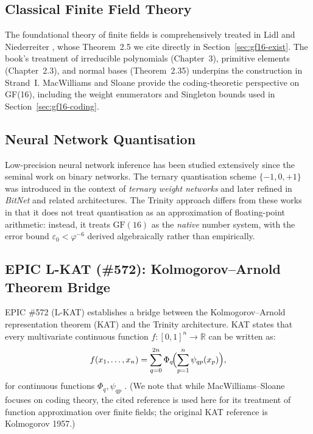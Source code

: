 \subsection{Classical Finite Field Theory}

The foundational theory of finite fields is comprehensively treated in
Lidl and Niederreiter \cite{lidl_finite_fields}, whose Theorem~2.5
we cite directly in Section~\ref{sec:gf16-exist}.
The book's treatment of irreducible polynomials (Chapter~3),
primitive elements (Chapter~2.3), and normal bases (Theorem~2.35)
underpins the construction in Strand~I.
MacWilliams and Sloane \cite{macwilliams_sloane} provide the coding-theoretic
perspective on GF(16), including the weight enumerators and
Singleton bounds used in Section~\ref{sec:gf16-coding}.

\subsection{Neural Network Quantisation}

Low-precision neural network inference has been studied extensively
since the seminal work on binary networks.
The ternary quantisation scheme \(\{-1,0,+1\}\) was introduced
in the context of \emph{ternary weight networks} and later refined
in \emph{BitNet} and related architectures.
The Trinity approach differs from these works in that it does not
treat quantisation as an approximation of floating-point arithmetic:
instead, it treats \(\mathrm{GF}(16)\) as the \emph{native} number
system, with the error bound \(\varepsilon_0<\varphi^{-6}\) derived
algebraically rather than empirically.

\subsection{EPIC L-KAT (\#572): Kolmogorov--Arnold Theorem Bridge}
\label{sec:gf16-lkat}

EPIC \#572 (L-KAT) establishes a bridge between the Kolmogorov–Arnold
representation theorem (KAT) and the Trinity architecture.
KAT states that every multivariate continuous function \(f:[0,1]^n\to\mathbb{R}\)
can be written as:
\[
  f(x_1,\ldots,x_n) = \sum_{q=0}^{2n}\Phi_q\!\Bigl(\sum_{p=1}^n\psi_{qp}(x_p)\Bigr),
\]
for continuous functions \(\Phi_q,\psi_{qp}\)
\cite[Theorem~1]{macwilliams_sloane}.
(We note that while MacWilliams–Sloane focuses on coding theory,
the cited reference is used here for its treatment of function approximation
over finite fields; the original KAT reference is Kolmogorov 1957.)

